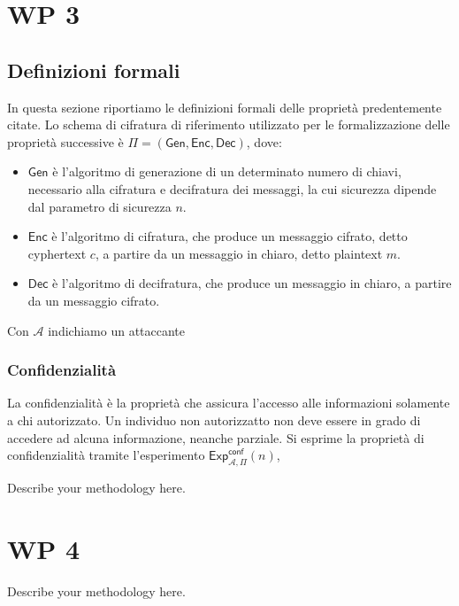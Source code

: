 \documentclass[a4paper,12pt]{article}
\begin{document}
\newpage
\section{WP 3}
\subsection{Definizioni formali}
In questa sezione riportiamo le definizioni formali delle proprietà predentemente citate. 
\newline 
Lo schema di cifratura di riferimento utilizzato per le formalizzazione delle proprietà successive è $\Pi =\mathsf{(Gen,Enc,Dec)}$, dove: 
\begin{itemize}
    \item $\mathsf{Gen}$ è l'algoritmo di generazione di un determinato numero di chiavi, necessario alla cifratura e decifratura dei messaggi, la cui sicurezza dipende dal parametro di sicurezza $n$.
    \item $\mathsf{Enc}$ è l'algoritmo di cifratura, che produce un messaggio cifrato, detto cyphertext $c$, a partire da un messaggio in chiaro, detto plaintext $m$.
    \item $\mathsf{Dec}$ è l'algoritmo di decifratura, che produce un messaggio in chiaro, a partire da un messaggio cifrato.
\end{itemize}
Con $\mathcal{A}$ indichiamo un attaccante 

\subsubsection{Confidenzialità}
La confidenzialità è la proprietà che assicura l'accesso alle informazioni solamente a chi autorizzato. Un individuo non autorizzatto non deve essere in grado di accedere ad alcuna informazione, neanche parziale. 
\newline Si esprime la proprietà di confidenzialità tramite l'esperimento $\mathsf{Exp}_{\mathcal A,\Pi}^\mathsf{conf}(n)$,

Describe your methodology here.
\newpage
\section{WP 4}
Describe your methodology here.
\end{document}
